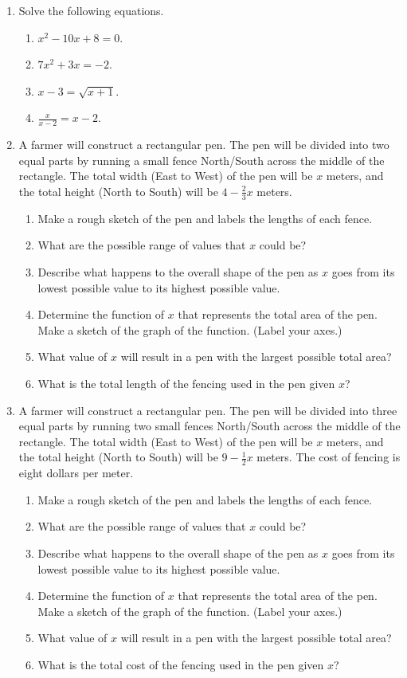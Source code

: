 \begin{enumerate}
\item Solve the following equations.
\begin{enumerate}
\item $x^2-10x+8=0$.
\item $7x^2+3x=-2$.
\item $x-3=\sqrt{x+1}$.
\item $\frac{x}{x-2}=x-2$.
\end{enumerate}

\item A farmer will construct a rectangular pen. The pen will be
  divided into two equal parts by running a small fence North/South
  across the middle of the rectangle. The total width (East to West)
  of the pen will be $x$ meters, and the total height (North to South)
  will be $4-\frac{2}{3}x$ meters.
  \begin{enumerate}
  \item Make a rough sketch of the pen and labels the lengths of each
    fence.
  \item What are the possible range of values that $x$ could be?
  \item Describe what happens to the overall shape of the pen as $x$
    goes from its lowest possible value to its highest possible value.
  \item Determine the function of $x$ that represents the total area
    of the pen. Make a sketch of the graph of the function. (Label
    your axes.)
  \item What value of $x$ will result in a pen with the largest
    possible total area?
  \item What is the total length of the fencing used in the pen given
    $x$?
  \end{enumerate}


\item A farmer will construct a rectangular pen. The pen will be
  divided into three equal parts by running two small fences
  North/South across the middle of the rectangle. The total width
  (East to West) of the pen will be $x$ meters, and the total height
  (North to South) will be $9-\frac{1}{2}x$ meters. The cost of
  fencing is eight dollars per meter.
  \begin{enumerate}
  \item Make a rough sketch of the pen and labels the lengths of each
    fence.
  \item What are the possible range of values that $x$ could be?
  \item Describe what happens to the overall shape of the pen as $x$
    goes from its lowest possible value to its highest possible value.
  \item Determine the function of $x$ that represents the total area
    of the pen. Make a sketch of the graph of the function. (Label
    your axes.)
  \item What value of $x$ will result in a pen with the largest
    possible total area?
  \item What is the total cost of the fencing used in the pen given
    $x$?
  \end{enumerate}

\end{enumerate}

